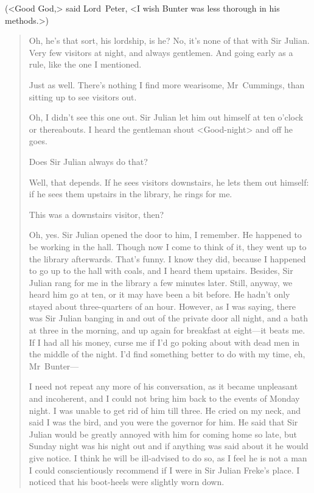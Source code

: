 (<Good God,> said Lord~Peter, <I wish Bunter was less thorough in his methods.>)

\begin{quotation}
\begin{dialogue}
 Oh, he's that sort, his lordship, is he?  No, it's none of that with Sir Julian. Very few visitors at night, and always gentlemen. And going early as a rule, like the one I mentioned.

 Just as well. There's nothing I find more wearisome, Mr~Cummings, than sitting up to see visitors out.

 Oh, I didn't see this one out. Sir Julian let him out himself at ten o'clock or thereabouts. I heard the gentleman shout <Good-night> and off he goes.

 Does Sir Julian always do that?

 Well, that depends. If he sees visitors downstairs, he lets them out himself: if he sees them upstairs in the library, he rings for me.

 This was a downstairs visitor, then?

 Oh, yes. Sir Julian opened the door to him, I remember. He happened to be working in the hall. Though now I come to think of it, they went up to the library afterwards. That's funny. I know they did, because I happened to go up to the hall with coals, and I heard them upstairs. Besides, Sir Julian rang for me in the library a few minutes later. Still, anyway, we heard him go at ten, or it may have been a bit before. He hadn't only stayed about three-quarters of an hour. However, as I was saying, there was Sir Julian banging in and out of the private door all night, and a bath at three in the morning, and up again for breakfast at eight—it beats me. If I had all his money, curse me if I'd go poking about with dead men in the middle of the night. I'd find something better to do with my time, eh, Mr~Bunter—

\end{dialogue}

I need not repeat any more of his conversation, as it became unpleasant and incoherent, and I could not bring him back to the events of Monday night. I was unable to get rid of him till three. He cried on my neck, and said I was the bird, and you were the governor for him. He said that Sir Julian would be greatly annoyed with him for coming home so late, but Sunday night was his night out and if anything was said about it he would give notice. I think he will be ill-advised to do so, as I feel he is not a man I could conscientiously recommend if I were in Sir Julian Freke's place. I noticed that his boot-heels were slightly worn down.


\end{quotation}
